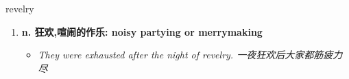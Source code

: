 
\begin{frame}
{\huge revelry}
\begin{center}
\begin{enumerate}\Large
  \item \textbf{n. 狂欢,喧闹的作乐: noisy partying or merrymaking}
  \begin{itemize}
    \item \em{\Large{They were exhausted after the night of revelry. 一夜狂欢后大家都筋疲力尽}}
  \end{itemize}
\end{enumerate}
\end{center}
\end{frame}
